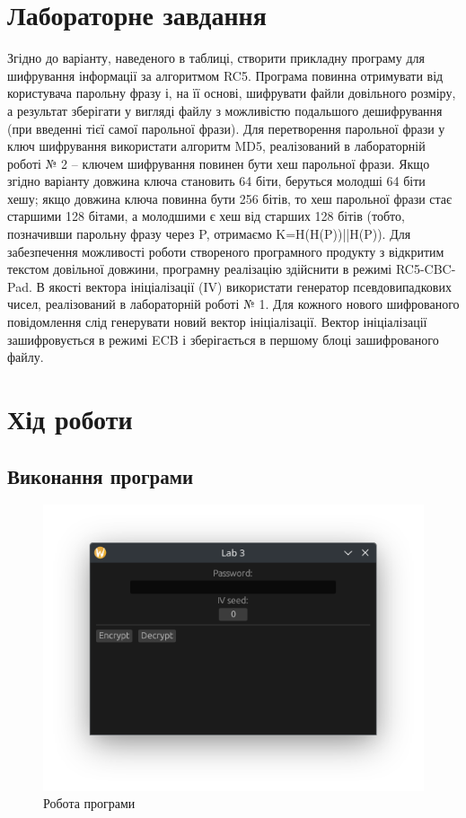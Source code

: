 \documentclass[oneside,14pt]{extarticle}
\begin{document}
\begin{normalsize}
    \section*{Лабораторне завдання}
    Згідно до варіанту, наведеного в таблиці, створити прикладну програму
    для шифрування інформації за алгоритмом RC5.
    Програма повинна отримувати від користувача парольну фразу і, на її
    основі, шифрувати файли довільного розміру, а результат зберігати у вигляді
    файлу з можливістю подальшого дешифрування (при введенні тієї самої
    парольної фрази).
    Для перетворення парольної фрази у ключ шифрування використати
    алгоритм MD5, реалізований в лабораторній роботі № 2 – ключем шифрування
    повинен бути хеш парольної фрази. Якщо згідно варіанту довжина ключа
    становить 64 біти, беруться молодші 64 біти хешу; якщо довжина ключа
    повинна бути 256 бітів, то хеш парольної фрази стає старшими 128 бітами, а
    молодшими є хеш від старших 128 бітів (тобто, позначивши парольну фразу
    через P, отримаємо K=H(H(P))||H(P)).
    Для забезпечення можливості роботи створеного програмного продукту з
    відкритим текстом довільної довжини, програмну реалізацію здійснити в
    режимі RC5-CBC-Pad. В якості вектора ініціалізації (IV) використати генератор
    псевдовипадкових чисел, реалізований в лабораторній роботі № 1. Для
    кожного нового шифрованого повідомлення слід генерувати новий вектор
    ініціалізації. Вектор ініціалізації зашифровується в режимі ECB і зберігається в
    першому блоці зашифрованого файлу.
    
	\section*{Хід роботи}
	
	\subsection*{Виконання програми}
	\begin{figure}[H]
		\centering
		\includegraphics[width=\columnwidth]{1}
		\caption{Робота програми}
	\end{figure}
	

\end{normalsize}
\end{document}
